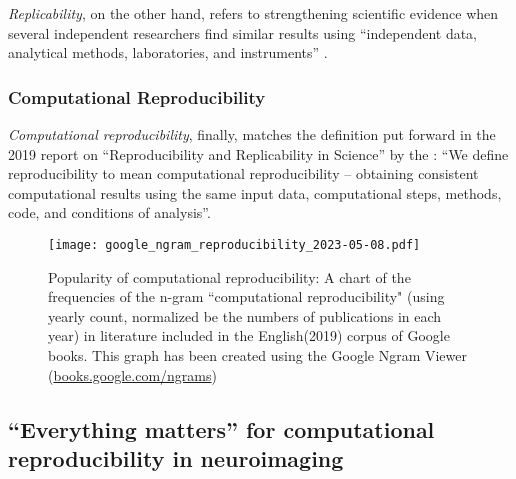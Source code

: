 \textit{Replicability}, on the other hand, refers to strengthening scientific evidence when several independent researchers find similar results using ``independent data, analytical methods, laboratories, and instruments'' \citep{peng2006}.

\subsubsection{Computational Reproducibility}

\textit{Computational reproducibility}, finally, matches the definition put forward in the 2019 report on ``Reproducibility and Replicability in Science'' by the \citet{engineering2019reproducibility}: ``We define reproducibility to mean computational reproducibility – obtaining consistent computational results using the same input data, computational steps, methods, code, and conditions of analysis''.


\begin{figure}
	\centering
	\texttt{[image: google\_ngram\_reproducibility\_2023-05-08.pdf]}
	\caption[Computational reproducibility in the literature]{Popularity of computational reproducibility: A chart of the frequencies of the n-gram ``computational reproducibility" (using yearly count, normalized be the numbers of publications in each year) in literature included in the English(2019) corpus of Google books. This graph has been created using the Google Ngram Viewer (\href{https://books.google.com/ngrams/info}{books.google.com/ngrams}) \citep{michel2011quantitative}}
	\label{fig:ngram}
\end{figure}


\subsection{``Everything matters'' for computational reproducibility in neuroimaging}


